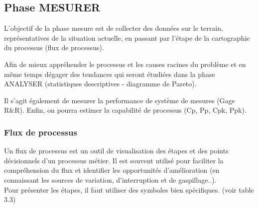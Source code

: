 \documentclass[12pt, a4paper]{thesis}
\begin{document}
\subsection{Phase MESURER}

L'objectif de la phase mesure est de collecter des données sur le terrain, représentatives de la situation actuelle, en passant par l'étape de la cartographie du processus (flux de processus).

Afin de mieux appréhender le processus et les causes racines du problème et en même temps dégager des tendances qui seront étudiées dans la phase ANALYSER (statistiques descriptives - diagramme de Pareto).

Il s'agit également de mesurer la performance de système de mesures (Gage R&R). Enfin, on pourra estimer la capabilité de processus (Cp, Pp, Cpk, Ppk).


\subsubsection{Flux de processus}

Un flux de processus est un outil de visualisation des étapes et des points décisionnels d’un processus métier. Il est souvent utilisé pour faciliter la compréhension du flux et identifier les opportunités d’amélioration (en connaissant les sources de variation, d’interruption et de gaspillage..). \\
Pour présenter les étapes, il faut utiliser des symboles bien spécifiques. (voir table 3.3)
\end{document}
